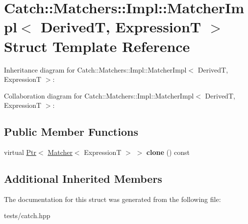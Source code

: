 \hypertarget{struct_catch_1_1_matchers_1_1_impl_1_1_matcher_impl}{}\section{Catch\+:\+:Matchers\+:\+:Impl\+:\+:Matcher\+Impl$<$ DerivedT, ExpressionT $>$ Struct Template Reference}
\label{struct_catch_1_1_matchers_1_1_impl_1_1_matcher_impl}


Inheritance diagram for Catch\+:\+:Matchers\+:\+:Impl\+:\+:Matcher\+Impl$<$ DerivedT, ExpressionT $>$\+:


Collaboration diagram for Catch\+:\+:Matchers\+:\+:Impl\+:\+:Matcher\+Impl$<$ DerivedT, ExpressionT $>$\+:
\subsection*{Public Member Functions}
\begin{DoxyCompactItemize}
\item 
\mbox{\label{struct_catch_1_1_matchers_1_1_impl_1_1_matcher_impl_af7cf4b7b730145d4455dc356490e6b77}} 
virtual \hyperlink{class_catch_1_1_ptr}{Ptr}$<$ \hyperlink{struct_catch_1_1_matchers_1_1_impl_1_1_matcher}{Matcher}$<$ ExpressionT $>$ $>$ {\bfseries clone} () const
\end{DoxyCompactItemize}
\subsection*{Additional Inherited Members}


The documentation for this struct was generated from the following file\+:\begin{DoxyCompactItemize}
\item 
tests/catch.\+hpp\end{DoxyCompactItemize}
